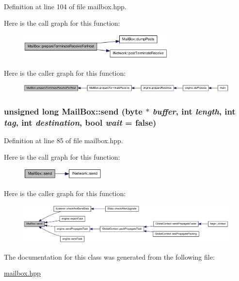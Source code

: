 Definition at line 104 of file mailbox.hpp.

Here is the call graph for this function:\nopagebreak
\begin{figure}[H]
\begin{center}
\leavevmode
\includegraphics[width=224pt]{class_mail_box_a45435c4ffb07fe13da0bcdacdde49bb6_cgraph}
\end{center}
\end{figure}


Here is the caller graph for this function:\nopagebreak
\begin{figure}[H]
\begin{center}
\leavevmode
\includegraphics[width=413pt]{class_mail_box_a45435c4ffb07fe13da0bcdacdde49bb6_icgraph}
\end{center}
\end{figure}
\hypertarget{class_mail_box_ae6b86c4b322220e0a416dadec6e50877}{
\subsubsection[{send}]{\setlength{\rightskip}{0pt plus 5cm}unsigned long MailBox::send ({\bf byte} $\ast$ {\em buffer}, \/  int {\em length}, \/  int {\em tag}, \/  int {\em destination}, \/  bool {\em wait} = {\ttfamily false})}}
\label{class_mail_box_ae6b86c4b322220e0a416dadec6e50877}


Definition at line 85 of file mailbox.hpp.

Here is the call graph for this function:\nopagebreak
\begin{figure}[H]
\begin{center}
\leavevmode
\includegraphics[width=122pt]{class_mail_box_ae6b86c4b322220e0a416dadec6e50877_cgraph}
\end{center}
\end{figure}


Here is the caller graph for this function:\nopagebreak
\begin{figure}[H]
\begin{center}
\leavevmode
\includegraphics[width=420pt]{class_mail_box_ae6b86c4b322220e0a416dadec6e50877_icgraph}
\end{center}
\end{figure}


The documentation for this class was generated from the following file:\begin{DoxyCompactItemize}
\item 
\hyperlink{mailbox_8hpp}{mailbox.hpp}\end{DoxyCompactItemize}
